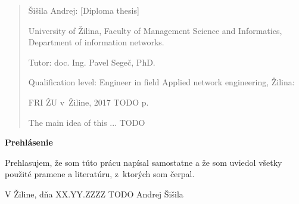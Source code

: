 

\begin{abstract}

\noindent
{\sc Šišila Andrej:} {\em \nazovpraceEN}
[Diploma thesis] 

\noindent
University of Žilina,  
Faculty of Management Science and Informatics, 
Department of information networks.
 
\noindent
Tutor:  doc. Ing. Pavel Segeč, PhD.
 
\noindent
Qualification level:
Engineer in field Applied network engineering, Žilina: 

\noindent
FRI ŽU v~Žiline, 2017 TODO p.

\bigskip

The main idea of this ... TODO

\end{abstract}


\newpage

\centerline{\bf Prehlásenie}

\vspace{2em}

\noindent
Prehlasujem, že som túto prácu napísal samostatne a že som uviedol 
všetky použité pramene a literatúru, z~ktorých som čerpal. 

\vspace{2em}

\noindent
V Žiline, dňa XX.YY.ZZZZ TODO
\hfill
Andrej Šišila

